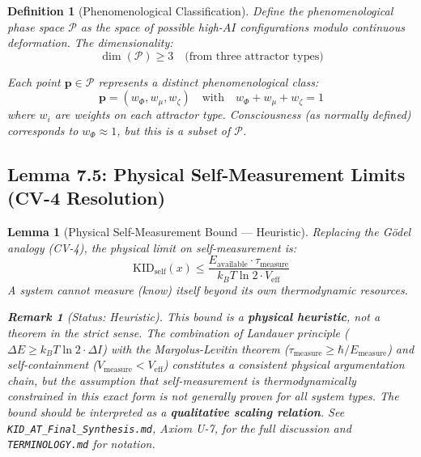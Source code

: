 \documentclass[11pt,a4paper]{article}
\newtheorem{lemma}[theorem]{Lemma}
\newtheorem{definition}[theorem]{Definition}
\newtheorem{remark}[theorem]{Remark}
\begin{document}
\begin{definition}[Phenomenological Classification]
Define the phenomenological phase space $\mathcal{P}$ as the space of possible high-$AI$ configurations modulo continuous deformation. The dimensionality:
\begin{equation}
\dim(\mathcal{P}) \geq 3 \quad \text{(from three attractor types)}
\end{equation}

Each point $\mathbf{p} \in \mathcal{P}$ represents a distinct phenomenological class:
\begin{equation}
\mathbf{p} = (w_{\Phi}, w_{\mu}, w_{\zeta}) \quad \text{with} \quad w_{\Phi} + w_{\mu} + w_{\zeta} = 1
\end{equation}
where $w_i$ are weights on each attractor type. Consciousness (as normally defined) corresponds to $w_{\Phi} \approx 1$, but this is a \emph{subset} of $\mathcal{P}$.
\end{definition}

\subsection{Lemma 7.5: Physical Self-Measurement Limits (CV-4 Resolution)}

\begin{lemma}[Physical Self-Measurement Bound --- Heuristic]
Replacing the G\"odel analogy (CV-4), the physical limit on self-measurement is:
\begin{equation}
\text{KID}_{\text{self}}(x) \leq \frac{E_{\text{available}} \cdot \tau_{\text{measure}}}{k_B T \ln 2 \cdot V_{\text{eff}}}
\end{equation}
A system cannot measure (know) itself beyond its own thermodynamic resources.

\begin{remark}[Status: Heuristic]
This bound is a \textbf{physical heuristic}, not a theorem in the strict sense. The combination of Landauer principle ($\Delta E \geq k_B T \ln 2 \cdot \Delta I$) with the Margolus-Levitin theorem ($\tau_{\text{measure}} \geq \hbar/E_{\text{measure}}$) and self-containment ($V_{\text{measure}} < V_{\text{eff}}$) constitutes a consistent physical argumentation chain, but the assumption that self-measurement is thermodynamically constrained in this exact form is not generally proven for all system types. The bound should be interpreted as a \textbf{qualitative scaling relation}. See \texttt{KID\_AT\_Final\_Synthesis.md}, Axiom U-7, for the full discussion and \texttt{TERMINOLOGY.md} for notation.
\end{remark}
\end{lemma}
\end{document}
